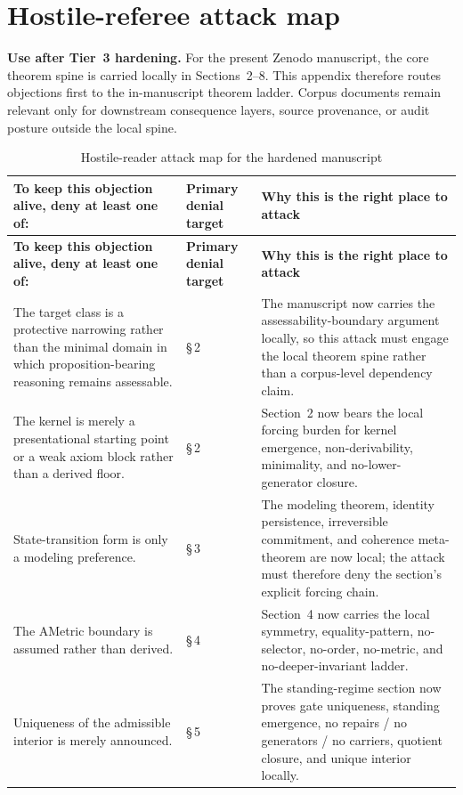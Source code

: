 \section{Hostile-referee attack map}
\label{app:attack-map}
\begin{fixedbox}
\textbf{Use after Tier~3 hardening.} For the present Zenodo manuscript, the core theorem spine is carried locally in Sections~2--8. This appendix therefore routes objections first to the in-manuscript theorem ladder. Corpus documents remain relevant only for downstream consequence layers, source provenance, or audit posture outside the local spine.
\end{fixedbox}

\begin{longtable}{P{0.34\textwidth}P{0.28\textwidth}P{0.26\textwidth}}
\caption{Hostile-reader attack map for the hardened manuscript}\\
\toprule
\textbf{To keep this objection alive, deny at least one of:} & \textbf{Primary denial target} & \textbf{Why this is the right place to attack} \\
\midrule
\endfirsthead
\toprule
\textbf{To keep this objection alive, deny at least one of:} & \textbf{Primary denial target} & \textbf{Why this is the right place to attack} \\
\midrule
\endhead
\bottomrule
\endfoot
The target class is a protective narrowing rather than the minimal domain in which proposition-bearing reasoning remains assessable. & \S\,2 & The manuscript now carries the assessability-boundary argument locally, so this attack must engage the local theorem spine rather than a corpus-level dependency claim. \\
The kernel is merely a presentational starting point or a weak axiom block rather than a derived floor. & \S\,2 & Section~2 now bears the local forcing burden for kernel emergence, non-derivability, minimality, and no-lower-generator closure. \\
State-transition form is only a modeling preference. & \S\,3 & The modeling theorem, identity persistence, irreversible commitment, and coherence meta-theorem are now local; the attack must therefore deny the section's explicit forcing chain. \\
The AMetric boundary is assumed rather than derived. & \S\,4 & Section~4 now carries the local symmetry, equality-pattern, no-selector, no-order, no-metric, and no-deeper-invariant ladder. \\
Uniqueness of the admissible interior is merely announced. & \S\,5 & The standing-regime section now proves gate uniqueness, standing emergence, no repairs / no generators / no carriers, quotient closure, and unique interior locally. \\

\end{longtable}
